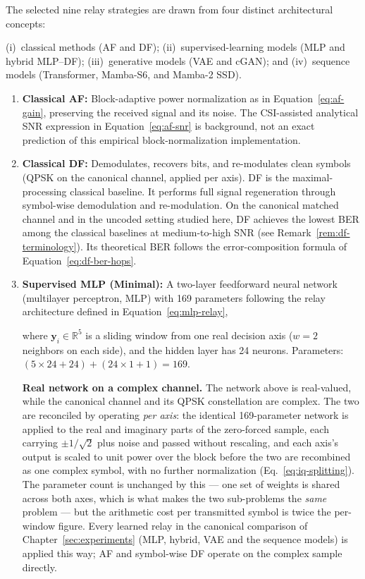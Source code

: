 The selected nine relay strategies are drawn from four distinct architectural concepts:

(i)~classical methods (AF and DF); (ii)~supervised-learning models
(MLP and hybrid MLP--DF); (iii)~generative models (VAE and cGAN); and
(iv)~sequence models (Transformer, Mamba-S6, and Mamba-2 SSD).

\begin{enumerate}
\item \textbf{Classical AF:} Block-adaptive power normalization as in Equation~\ref{eq:af-gain}, preserving the received signal and its noise. The CSI-assisted analytical SNR expression in Equation~\ref{eq:af-snr} is background, not an exact prediction of this empirical block-normalization implementation.
\item \textbf{Classical DF:} Demodulates, recovers bits, and re-modulates clean symbols (QPSK on the canonical channel, applied per axis). DF is the maximal-processing classical baseline. It performs full signal regeneration through symbol-wise demodulation and re-modulation. On the canonical matched channel and in the uncoded setting studied here, DF achieves the lowest BER among the classical baselines at medium-to-high SNR (see Remark~\ref{rem:df-terminology}). Its theoretical BER follows the error-composition formula of Equation~\ref{eq:df-ber-hops}.

\item \textbf{Supervised MLP (Minimal):} A two-layer feedforward neural network (multilayer perceptron, MLP) with 169 parameters following the relay architecture defined in Equation~\ref{eq:mlp-relay},

where \(\mathbf{y}_i \in \mathbb{R}^5\) is a sliding window from one real decision axis (\(w=2\) neighbors on each side), and the hidden layer has 24 neurons. Parameters: \((5 \times 24 + 24) + (24 \times 1 + 1) = 169\).

\textbf{Real network on a complex channel.} The network above is real-valued, while the canonical channel and its QPSK constellation are complex. The two are reconciled by operating \emph{per axis}: the identical 169-parameter network is applied to the real and imaginary parts of the zero-forced sample, each carrying $\pm1/\sqrt{2}$ plus noise and passed without rescaling, and each axis's output is scaled to unit power over the block before the two are recombined as one complex symbol, with no further normalization (Eq.~\eqref{eq:iq-splitting}). The parameter count is unchanged by this --- one set of weights is shared across both axes, which is what makes the two sub-problems the \emph{same} problem --- but the arithmetic cost per transmitted symbol is twice the per-window figure. Every learned relay in the canonical comparison of Chapter~\ref{sec:experiments} (MLP, hybrid, VAE and the sequence models) is applied this way; AF and symbol-wise DF operate on the complex sample directly.


\end{enumerate}
